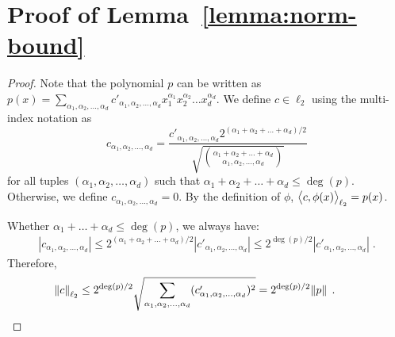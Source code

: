 \section{Proof of Lemma~\ref{lemma:norm-bound}}
\label{section:proof-norm-bound}

\begin{proof}
Note that the polynomial $p$ can be written as
$p(x) = \sum_{\alpha_1, \alpha_2, \dots, \alpha_d} c'_{\alpha_1, \alpha_2, \dots, \alpha_d} x_1^{\alpha_1} x_2^{\alpha_2} \dots x_d^{\alpha_d}$.
We define $c \in \ell_2$ using the multi-index notation as
$$
c_{\alpha_1, \alpha_2, \dots, \alpha_d}
= \frac{c'_{\alpha_1, \alpha_2, \dots, \alpha_d} 2^{(\alpha_1 + \alpha_2 + \dots + \alpha_d)/2}}{\sqrt{\binom{\alpha_1 + \alpha_2 + \dots + \alpha_d}{\alpha_1, \alpha_2, \dots, \alpha_d}}}
$$
for all tuples $(\alpha_1, \alpha_2, \dots, \alpha_d)$ such that $\alpha_1 + \alpha_2 + \dots + \alpha_d \le \deg(p)$.
Otherwise, we define $c_{\alpha_1, \alpha_2, \dots, \alpha_d} = 0$. By the definition
of $\phi$, $\left\langle c, \phi(x) \right\rangle_{\ell_2} = p(x)$.

Whether $\alpha_1 + \ldots + \alpha_d \leq \deg(p)$, we always have:
\begin{align*}
|c_{\alpha_1, \alpha_2, \dots, \alpha_d}|
 \le 2^{(\alpha_1 + \alpha_2 + \dots + \alpha_d)/2} |c'_{\alpha_1, \alpha_2, \dots, \alpha_d}|
 \le 2^{\deg(p)/2} |c'_{\alpha_1, \alpha_2, \dots, \alpha_d}| \; .
\end{align*}
Therefore,
\begin{align*}
\norm{c}_{\ell_2}
 \le 2^{\deg(p)/2} \sqrt{\sum_{\alpha_1, \alpha_2, \dots, \alpha_d} (c'_{\alpha_1, \alpha_2, \dots, \alpha_d})^2} 
 = 2^{\deg(p)/2} \norm{p} \; . \qquad \qedhere
\end{align*}
\end{proof}
